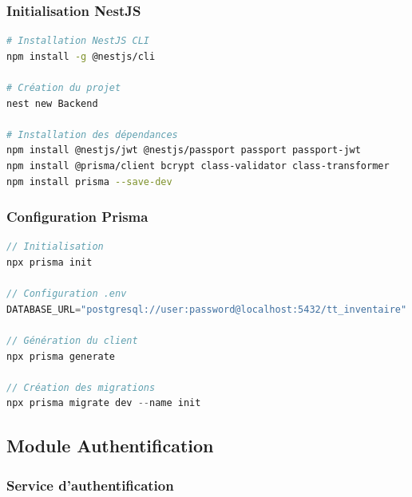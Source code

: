 \subsubsection{Initialisation NestJS}

\begin{lstlisting}[language=bash, caption=Création du projet NestJS]
# Installation NestJS CLI
npm install -g @nestjs/cli

# Création du projet
nest new Backend

# Installation des dépendances
npm install @nestjs/jwt @nestjs/passport passport passport-jwt
npm install @prisma/client bcrypt class-validator class-transformer
npm install prisma --save-dev
\end{lstlisting}

\subsubsection{Configuration Prisma}

\begin{lstlisting}[language=JavaScript, caption=Initialisation Prisma]
// Initialisation
npx prisma init

// Configuration .env
DATABASE_URL="postgresql://user:password@localhost:5432/tt_inventaire"

// Génération du client
npx prisma generate

// Création des migrations
npx prisma migrate dev --name init
\end{lstlisting}

\subsection{Module Authentification}

\subsubsection{Service d'authentification}

